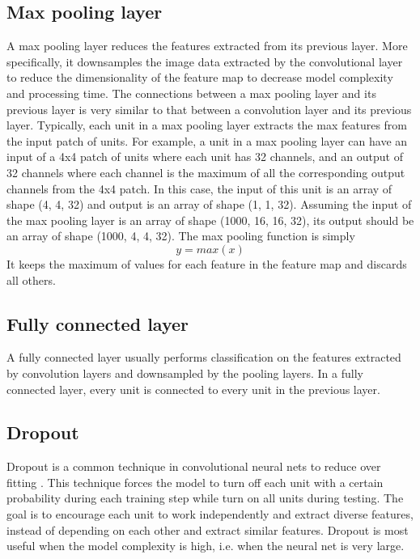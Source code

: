 \documentclass[12pt]{WSUThesis}
\theoremstyle{definition}
\begin{document}
\subsection{Max pooling layer}
A max pooling layer reduces the features extracted from its previous layer.
More specifically, it downsamples the image data extracted by the convolutional layer to reduce the dimensionality of the feature map to decrease model complexity and processing time.
The connections between a max pooling layer and its previous layer is very similar to that between a convolution layer and its previous layer.
Typically, each unit in a max pooling layer extracts the max features from the input patch of units.
For example, a unit in a max pooling layer can have an input of a 4x4 patch of units where each unit has 32 channels, and an output of 32 channels where each channel is the maximum of all the corresponding output channels from the 4x4 patch.
In this case, the input of this unit is an array of shape (4, 4, 32) and output is an array of shape (1, 1, 32).
Assuming the input of the max pooling layer is an array of shape (1000, 16, 16, 32), its output should be an array of shape (1000, 4, 4, 32).
The max pooling function is simply
\[ y = max(x) \]
It keeps the maximum of values for each feature in the feature map and discards all others.

\subsection{Fully connected layer}
A fully connected layer usually performs classification on the features extracted by convolution layers and downsampled by the pooling layers.
In a fully connected layer, every unit is connected to every unit in the previous layer.

\subsection{Dropout}
Dropout is a common technique in convolutional neural nets to reduce over fitting \cite{srivastava2014dropout}. This technique forces the model to turn off each unit with a certain probability during each training step while turn on all units during testing.
The goal is to encourage each unit to work independently and extract diverse features, instead of depending on each other and extract similar features.
Dropout is most useful when the model complexity is high, i.e. when the neural net is very large.
\end{document}
